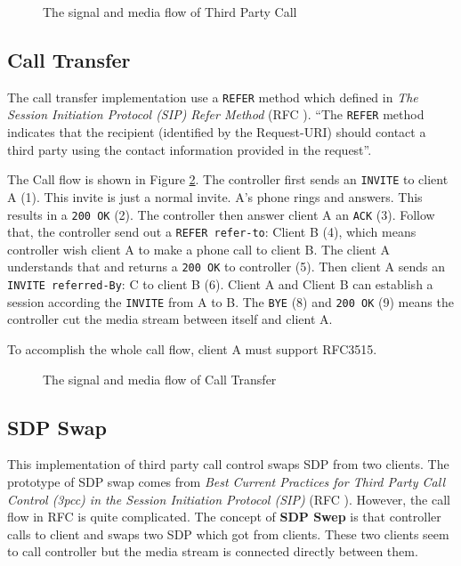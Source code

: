 \begin{figure}[!hbtp]
\centering
{}
\caption{The signal and media flow of Third Party Call}
\label{fig:TheSignalAndMediaFlowOf3pc}
\end{figure}

\subsection{Call Transfer}
\label{sec:Solution:ThirdPartyCall:CallTransfer}

The call transfer implementation use a \texttt{REFER} method which defined in \textit{The Session Initiation Protocol (SIP) Refer Method} (RFC \nobreak {})\cite{RFC3515}. ``The \texttt{REFER} method indicates that the recipient (identified by the Request-URI) should contact a third party using the contact information provided in the request''\cite{RFC3515}. 

The Call flow is shown in Figure \ref{fig:CallTransfer}. The controller first sends an \texttt{INVITE} to client A (1). This invite is just a normal invite. A's phone rings and answers. This results in a \texttt{200 OK} (2). The controller then answer client A an \texttt{ACK} (3). Follow that, the controller send out a \texttt{REFER refer-to}: Client B (4), which means controller wish client A to make a phone call to client B. The client A understands that and returns a \texttt{200 \nolinebreak OK} to controller (5). Then client A sends an \texttt{INVITE referred-By}: C to client B (6). Client A and Client B can establish a session according the \texttt{INVITE} from A to B.  The \texttt{BYE} (8) and \texttt{200 \nolinebreak OK} (9) means the controller cut the media stream between itself and client A. 

To accomplish the whole call flow, client A must support RFC3515.

\begin{figure}[!hbtp]
\centering
{}
\caption{The signal and media flow of Call Transfer}
\label{fig:CallTransfer}
\end{figure}

\subsection{SDP Swap}
\label{sec:Solution:ThirdPartyCall:SDPSwep}

This implementation of third party call control swaps SDP from two clients. The prototype of SDP swap comes from  \textit{Best Current Practices for Third Party Call Control (3pcc) in the Session Initiation Protocol (SIP)} (RFC \nolinebreak {}). However, the call flow in RFC \nolinebreak {} is quite complicated. The concept of \textbf{SDP Swep} is that controller calls to client and swaps two SDP which got from clients. These two clients seem to call controller but the media stream is connected directly between them.

